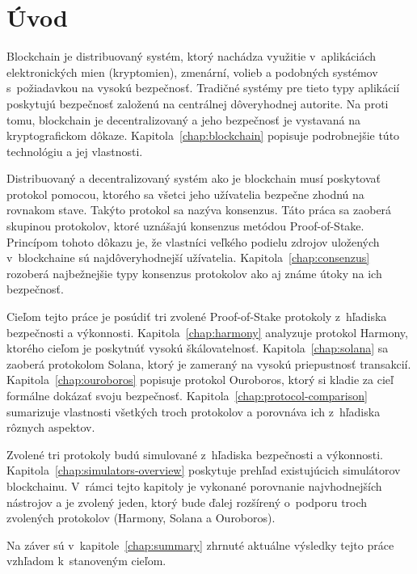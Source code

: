 \chapter{Úvod}

Blockchain je distribuovaný systém, ktorý nachádza využitie v~aplikáciách elektronických mien (kryptomien), zmenární, volieb a podobných systémov s~požiadavkou na vysokú bezpečnosť. Tradičné systémy pre tieto typy aplikácií poskytujú bezpečnosť založenú na centrálnej dôveryhodnej autorite. Na proti tomu, blockchain je decentralizovaný a jeho bezpečnosť je vystavaná na kryptografickom dôkaze. Kapitola~\ref{chap:blockchain} popisuje podrobnejšie túto technológiu a jej vlastnosti.

Distribuovaný a decentralizovaný systém ako je blockchain musí poskytovať protokol pomocou, ktorého sa všetci jeho užívatelia bezpečne zhodnú na rovnakom stave. Takýto protokol sa nazýva konsenzus. Táto práca sa zaoberá skupinou protokolov, ktoré uznášajú konsenzus metódou Proof-of-Stake. Princípom tohoto dôkazu je, že vlastníci veľkého podielu zdrojov uložených v~blockchaine sú najdôveryhodnejší užívatelia. Kapitola~\ref{chap:consenzus} rozoberá najbežnejšie typy konsenzus protokolov ako aj známe útoky na ich bezpečnosť.

Cieľom tejto práce je posúdiť tri zvolené Proof-of-Stake protokoly z~hľadiska bezpečnosti a výkonnosti. Kapitola~\ref{chap:harmony} analyzuje protokol Harmony, ktorého cieľom je poskytnúť vysokú škálovatelnosť. Kapitola~\ref{chap:solana} sa zaoberá protokolom Solana, ktorý je zameraný na vysokú priepustnosť transakcií. Kapitola~\ref{chap:ouroboros} popisuje protokol Ouroboros, ktorý si kladie za cieľ formálne dokázať svoju bezpečnosť. Kapitola~\ref{chap:protocol-comparison} sumarizuje vlastnosti všetkých troch protokolov a porovnáva ich z~hľadiska rôznych aspektov.

Zvolené tri protokoly budú simulované z~hľadiska bezpečnosti a výkonnosti. Kapitola~\ref{chap:simulators-overview} poskytuje prehľad existujúcich simulátorov blockchainu. V~rámci tejto kapitoly je vykonané porovnanie najvhodnejších nástrojov a je zvolený jeden, ktorý bude ďalej rozšírený o~podporu troch zvolených protokolov (Harmony, Solana a Ouroboros).

Na záver sú v~kapitole~\ref{chap:summary} zhrnuté aktuálne výsledky tejto práce vzhľadom k~stanoveným cieľom.

